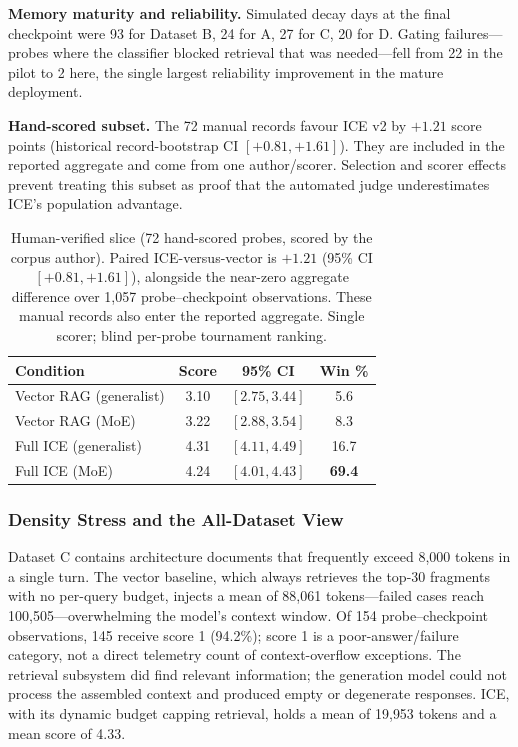 \documentclass[twoside,11pt]{article}
\begin{document}
\textbf{Memory maturity and reliability.} Simulated decay days at the final checkpoint were 93 for Dataset B, 24 for A, 27 for C, 20 for D. Gating failures---probes where the classifier blocked retrieval that was needed---fell from 22 in the pilot to 2 here, the single largest reliability improvement in the mature deployment.

\textbf{Hand-scored subset.} The 72 manual records favour ICE v2 by $+1.21$ score points (historical record-bootstrap CI $[+0.81,+1.61]$). They are included in the reported aggregate and come from one author/scorer. Selection and scorer effects prevent treating this subset as proof that the automated judge underestimates ICE's population advantage.

\begin{table}[tbp]
\centering
\small


\begin{tabular}{@{}lccc@{}}
\toprule
\textbf{Condition} & \textbf{Score} & \textbf{95\% CI} & \textbf{Win \%} \\
\midrule
Vector RAG (generalist) & 3.10 & $[2.75, 3.44]$ & 5.6 \\
Vector RAG (MoE)        & 3.22 & $[2.88, 3.54]$ & 8.3 \\
Full ICE (generalist)   & 4.31 & $[4.11, 4.49]$ & 16.7 \\
Full ICE (MoE)          & 4.24 & $[4.01, 4.43]$ & \textbf{69.4} \\
\bottomrule
\end{tabular}
\caption{Human-verified slice (72 hand-scored probes, scored by the corpus author). Paired ICE-versus-vector is $+1.21$ (95\% CI $[+0.81, +1.61]$), alongside the near-zero aggregate difference over 1{,}057 probe--checkpoint observations. These manual records also enter the reported aggregate. Single scorer; blind per-probe tournament ranking.}
\label{tab:manual}
\end{table}

\subsubsection{Density Stress and the All-Dataset View}
\label{sec:stress}

Dataset C contains architecture documents that frequently exceed 8{,}000 tokens in a single turn. The vector baseline, which always retrieves the top-30 fragments with no per-query budget, injects a mean of 88{,}061 tokens---failed cases reach 100{,}505---overwhelming the model's context window. Of 154 probe--checkpoint observations, 145 receive score 1 (94.2\%); score 1 is a poor-answer/failure category, not a direct telemetry count of context-overflow exceptions. The retrieval subsystem did find relevant information; the generation model could not process the assembled context and produced empty or degenerate responses. ICE, with its dynamic budget capping retrieval, holds a mean of 19{,}953 tokens and a mean score of 4.33.
\end{document}
